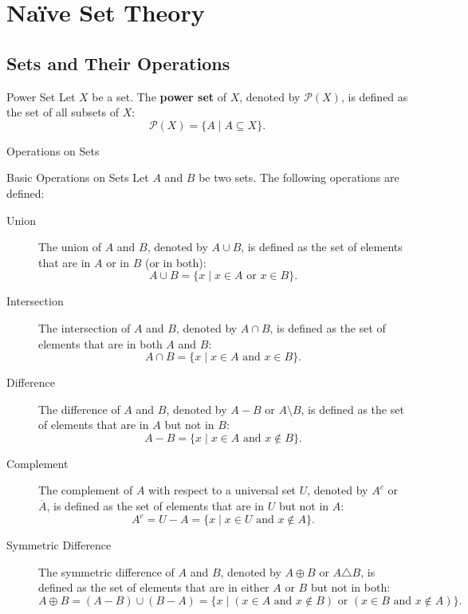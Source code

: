 \chapter{Naïve Set Theory} %
\section{Sets and Their Operations} %


\begin{definition}{Power Set} %
    Let \(X\) be a set. 
    The \textbf{power set} of \(X\), denoted by \(\mathscr{P}(X)\), 
    is defined as the set of all subsets of \(X\):
    \[
        \mathscr{P}(X) = \{A \mid A \subseteq X\}.
    \]
\end{definition}

\begin{leftbarTitle}{Operations on Sets}\end{leftbarTitle} %
\begin{definition}{Basic Operations on Sets} %
    Let \(A\) and \(B\) be two sets. The following operations are defined:
    \begin{description}
        \item[Union] The union of \(A\) and \(B\), denoted by \(A \cup B\), 
            is defined as the set of elements that are in \(A\) or in \(B\) (or in both):
            \[
                A \cup B = \{x \mid x \in A \text{ or } x \in B\}.
            \]
        \item[Intersection] The intersection of \(A\) and \(B\), denoted by \(A \cap B\), 
            is defined as the set of elements that are in both \(A\) and \(B\):
            \[
                A \cap B = \{x \mid x \in A \text{ and } x \in B\}.
            \]
        \item[Difference] The difference of \(A\) and \(B\), denoted by \(A - B\) or \(A \setminus B\), 
            is defined as the set of elements that are in \(A\) but not in \(B\):
            \[
                A - B = \{x \mid x \in A \text{ and } x \notin B\}.
            \]
        \item[Complement] The complement of \(A\) with respect to a universal set \(U\), 
            denoted by \(A^c\) or \(\overline{A}\), is defined as the set of elements that are in \(U\) but not in \(A\):
            \[
                A^c = U - A = \{x \mid x \in U \text{ and } x \notin A\}.
            \]
        \item[Symmetric Difference] The symmetric difference of \(A\) and \(B\), 
            denoted by \(A \oplus B\) or \(A \triangle B\), is defined as the set of elements that are in either \(A\) or \(B\) 
            but not in both:
            \[
                A \oplus B = (A - B) \cup (B - A) = \{x \mid (x \in A \text{ and } x \notin B) \text{ or } (x \in B \text{ and } x \notin A)\}.
            \]
    \end{description}
\end{definition}


